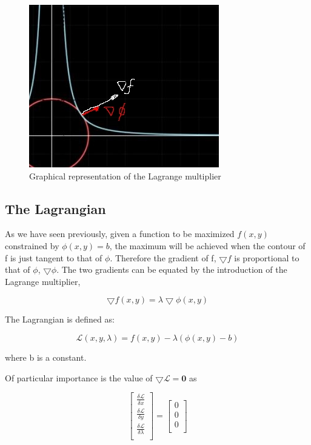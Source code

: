 \documentclass[]{article}
\begin{document}
\begin{figure}[h]
\centering
\includegraphics[width=0.7\linewidth]{img/fig_3}
\caption{Graphical representation of the Lagrange multiplier}
\label{fig:fig3}
\end{figure}

\subsection{The Lagrangian}

As we have seen previously, given a function to be maximized $f(x,y)$  constrained by $\phi(x,y)= b$, the maximum will be achieved when the contour of f is just tangent to that of $\phi$. Therefore the gradient of f, $\bigtriangledown f$ is proportional to that of $\phi$, $\bigtriangledown \phi$. The two gradients can be equated by the introduction of the Lagrange multiplier, 

\begin{equation}
\bigtriangledown f(x,y) = \lambda \bigtriangledown  \phi(x,y)
\end{equation}

The Lagrangian is defined as:

\begin{equation}
\mathcal{L}(x,y,\lambda) = f(x,y) - \lambda \left( \phi(x,y) - b \right) 
\end{equation}

where b is a constant.

Of particular importance is the value of $\bigtriangledown \mathcal{L} = \textbf{0}$ as

\[
\renewcommand\arraystretch{2}
\begin{bmatrix}
\frac{\delta \mathcal{L}}{\delta x} \\
\frac{\delta \mathcal{L}}{\delta y} \\
\frac{\delta \mathcal{L}}{\delta \lambda} \\
\end{bmatrix}
=
\begin{bmatrix}
0 \\
0 \\
0 \\
\end{bmatrix}
\]
\end{document}
